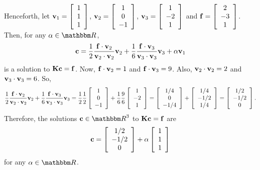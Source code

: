 \begin{solution}
\begin{enumerate}
Henceforth, let ${\bf v}_1=\left[\begin{array}{c}1 \\ 1 \\ 1\end{array}\right]$, ${\bf v}_2=\left[\begin{array}{c}1 \\ 0 \\ -1\end{array}\right]$, ${\bf v}_3=\left[\begin{array}{c}1 \\ -2 \\ 1\end{array}\right]$ and ${\bf f}=\left[\begin{array}{c}2 \\ -3 \\ 1\end{array}\right]$. Then, for any $\alpha\in\R$,
\[
{\bf c}={1 \over 2}{{\bf f}\cdot{\bf v}_2 \over {\bf v}_2\cdot{\bf v}_2}{\bf v}_2+{1 \over 6}{{\bf f}\cdot{\bf v}_3 \over {\bf v}_3\cdot{\bf v}_3}{\bf v}_3+\alpha{\bf v}_1
\]
is a solution to ${\bf K}{\bf c}={\bf f}$. Now, ${\bf f}\cdot{\bf v}_2=1$ and ${\bf f}\cdot{\bf v}_3=9$. Also, ${\bf v}_2\cdot{\bf v}_2=2$ and ${\bf v}_3\cdot{\bf v}_3=6$. So,
\[
{1 \over 2}{{\bf f}\cdot{\bf v}_2 \over {\bf v}_2\cdot{\bf v}_2}{\bf v}_2+{1 \over 6}{{\bf f}\cdot{\bf v}_3 \over {\bf v}_3\cdot{\bf v}_3}{\bf v}_3={1 \over 2}{1 \over 2}\left[\begin{array}{c}1 \\ 0 \\ -1\end{array}\right]+{1 \over 6}{9 \over 6}\left[\begin{array}{c}1 \\ -2 \\ 1\end{array}\right]=\left[\begin{array}{c}1/4 \\ 0 \\ -1/4\end{array}\right]+\left[\begin{array}{c}1/4 \\ -1/2 \\ 1/4\end{array}\right]=\left[\begin{array}{c}1/2 \\ -1/2 \\ 0\end{array}\right].
\]
Therefore, the solutions $\Bc\in\R^3$ to ${\bf K}{\bf c}={\bf f}$ are
\[
{\bf c}=\left[\begin{array}{c}1/2 \\ -1/2 \\ 0\end{array}\right]+\alpha\left[\begin{array}{c}1 \\ 1 \\ 1\end{array}\right]
\]
for any $\alpha\in\R$.




\end{enumerate}
\end{solution}

